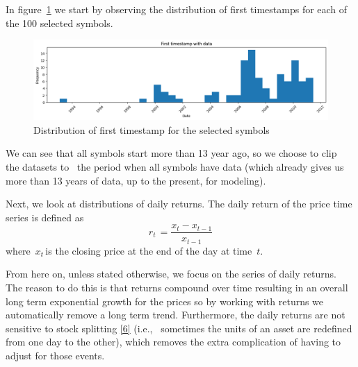 \documentclass[10pt]{article}
\begin{document}
In figure~{\ref{980651}} we start by observing the
distribution of first timestamps for each of the 100 selected symbols.
\begin{figure}[H]
\begin{center}
\includegraphics[width=0.98\columnwidth]{figures/output/output}
\caption{{Distribution of first timestamp for the selected symbols
{\label{980651}}%
}}
\end{center}
\end{figure}

We can see that all symbols start more than 13 year ago, so we choose to
clip~ the datasets to~ the period when all symbols have data (which
already gives us more than 13 years of data, up to the present, for
modeling).~

Next, we look at distributions of daily returns. The daily return of the
price time series is defined as~\[r_{t\ }=\frac{x_t-x_{t-1}}{x_{t-1}}\]
where~\(x_{t\ }\)is the closing price at the end of the day at
time~\(t\).

From here on, unless stated otherwise, we focus on the series of daily
returns. The reason to do this is that returns compound over time
resulting in an overall long term exponential growth for the prices so
by working with returns we automatically remove a long term trend.
Furthermore, the daily returns are not sensitive to stock splitting
\hyperref[csl:6]{[6]} (i.e.,~ sometimes the units of an asset are redefined
from one day to the other), which removes the extra complication of
having to adjust for those events.~
\end{document}
